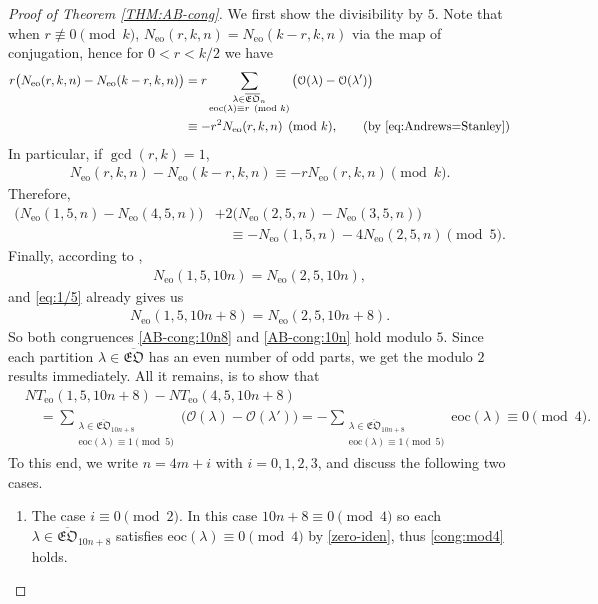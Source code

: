 \documentclass[12pt,reqno]{amsart}
\numberwithin{equation}{section}
\theoremstyle{plain}
\theoremstyle{definition}
\def\bfEO{\overline{\mathfrak{EO}}}
\def\eoc{\mathrm{eoc}}
\begin{document}
\begin{proof}[Proof of Theorem \ref{THM:AB-cong}]
We first show the divisibility by $5$. Note that when $r\not\equiv 0 \pmod k$,
$N_{\textrm{eo}}(r,k,n)=N_{\textrm{eo}}(k-r,k,n)$ via the map of conjugation, hence for $0<r<k/2$ we have
\begin{align*}
r\big(N_{\textrm{eo}}(r,k,n)-N_{\textrm{eo}}(k-r,k,n)\big)
 &=r\sum_{\substack{\lambda\in\overline{\mathfrak{EO}}_n \\ \eoc(\lambda)\equiv r\pmod{k}}}
\big(\mathcal{O}(\lambda)-\mathcal{O}(\lambda')\big) \\
 &\equiv-r^2N_{\textrm{eo}}(r,k,n)\pmod k, \qquad (\text{by~\eqref{eq:Andrews=Stanley}})
\end{align*}
In particular, if $\gcd(r,k)=1$,
\begin{align*}
N_{\textrm{eo}}(r,k,n)-N_{\textrm{eo}}(k-r,k,n)\equiv-rN_{\textrm{eo}}(r,k,n)\pmod{k}.
\end{align*}
Therefore,
\begin{align*}
\big(N_{\textrm{eo}}(1,5,n)-N_{\textrm{eo}}(4,5,n)\big)
 &+2\big(N_{\textrm{eo}}(2,5,n)-N_{\textrm{eo}}(3,5,n)\big)\\
 &\quad\equiv-N_{\textrm{eo}}(1,5,n)-4N_{\textrm{eo}}(2,5,n)\pmod{5}.
\end{align*}
Finally, according to \cite[Theorem 2.1.5]{Pas},
\begin{align*}
N_{\textrm{eo}}(1,5,10n)=N_{\textrm{eo}}(2,5,10n),
\end{align*}
and \eqref{eq:1/5} already gives us
\begin{align*}
N_{\textrm{eo}}(1,5,10n+8)=N_{\textrm{eo}}(2,5,10n+8).
\end{align*}
So both congruences \eqref{AB-cong:10n8} and \eqref{AB-cong:10n} hold modulo $5$. Since each partition
$\lambda\in\overline{\mathfrak{EO}}$ has an even number of odd parts, we get the modulo $2$ results
immediately. All it remains, is to show that
\begin{align}
 &NT_{\textrm{eo}}(1,5,10n+8)-NT_{\textrm{eo}}(4,5,10n+8)\nonumber\\
 &\quad=\sum_{\substack{\lambda\in\bfEO_{10n+8} \\ \eoc(\lambda)\equiv 1\pmod{5}}}
\big(\mathcal{O}(\lambda)-\mathcal{O}(\lambda')\big)
=-\sum_{\substack{\lambda\in\bfEO_{10n+8} \\ \eoc(\lambda)\equiv1\pmod{5}}}
\eoc(\lambda)\equiv0\pmod 4.\label{cong:mod4}
\end{align}
To this end, we write $n=4m+i$ with $i=0,1,2,3$, and discuss the following two cases.
\begin{enumerate}[(1)]
\item The case $i\equiv0\pmod{2}$. In this case $10n+8\equiv 0 \pmod 4$ so each
$\lambda\in\overline{\mathfrak{EO}}_{10n+8}$ satisfies $\textrm{eoc}(\lambda)\equiv 0\pmod 4$ by
\eqref{zero-iden}, thus \eqref{cong:mod4} holds.


\end{enumerate}
\end{proof}
\end{document}
